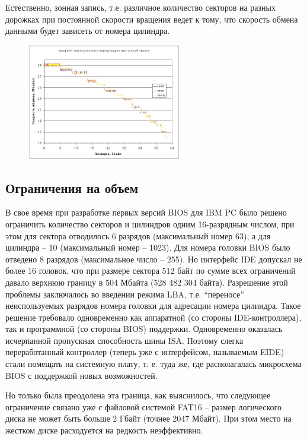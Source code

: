 \documentclass[bachelor, och, referat]{SCWorks}
\begin{document}
Естественно, зонная запись, т.е. различное количество секторов на разных 
дорожках при постоянной скорости вращения ведет к тому, что скорость обмена 
данными будет зависеть от номера цилиндра.

\begin{figure}[H]
    \centering
    \includegraphics[width=0.6\textwidth]{graph1.png}
    \caption{}
    \label{}
\end{figure}

\subsection{Ограничения на объем}

В свое время при разработке первых версий BIOS для IBM PC было решено ограничить
количество секторов и цилиндров одним 16-разрядным числом, при этом для сектора 
отводилось 6 разрядов (максимальный номер 63), а для цилиндра -- 10 
(максимальный номер – 1023). Для номера головки BIOS было отведено 8 разрядов 
(максимальное число – 255). Но интерфейс IDE допускал не более 16 головок, что 
при размере сектора 512 байт по сумме всех ограничений давало верхнюю границу в 
504 Мбайта (528 482 304 байта). Разрешение этой проблемы заключалось во введении
режима LBA, т.е. ``переносе'' неиспользуемых разрядов номера головки для адресации
номера цилиндра. Такое решение требовало одновременно как аппаратной (со стороны 
IDE-контроллера), так и программной (со стороны BIOS) поддержки. Одновременно 
оказалась исчерпанной пропускная способность шины ISA. Поэтому слегка 
переработанный контроллер (теперь уже с интерфейсом, называемым EIDE) стали 
помещать на системную плату, т. е. туда же, где располагалась микросхема BIOS с 
поддержкой новых возможностей.

Но только была преодолена эта граница, как выяснилось, что следующее ограничение 
связано уже с файловой системой FAT16 – размер логического диска не может быть 
больше 2 Гбайт (точнее 2047 Мбайт). При этом место на жестком диске расходуется 
на редкость неэффективно.
\end{document}
